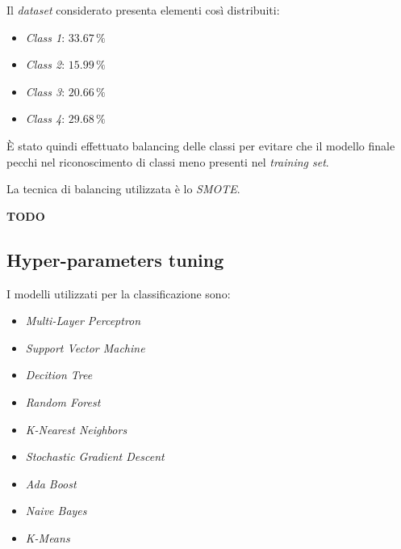                         Il \textit{dataset} considerato presenta elementi così distribuiti:
                        \begin{itemize}
                                \item \textit{Class 1}: $33.67 \, \%$
                                \item \textit{Class 2}: $15.99 \, \%$
                                \item \textit{Class 3}: $20.66 \, \%$
                                \item \textit{Class 4}: $29.68 \, \%$
                        \end{itemize}
                        
                        \`E stato quindi effettuato balancing delle classi per evitare che il modello finale pecchi nel riconoscimento di classi meno presenti nel \textit{training set}.
                        
                        La tecnica di balancing utilizzata è lo \textit{SMOTE}.
                        
                        \textbf{TODO}
                

        \subsection{Hyper-parameters tuning}
        
                I modelli utilizzati per la classificazione sono:
                \begin{itemize}
                        \item \textit{Multi-Layer Perceptron}
                        \item \textit{Support Vector Machine}
                        \item \textit{Decition Tree}
                        \item \textit{Random Forest}
                        \item \textit{K-Nearest Neighbors}
                        \item \textit{Stochastic Gradient Descent}
                        \item \textit{Ada Boost}
                        \item \textit{Naive Bayes}
                        \item \textit{K-Means}
                \end{itemize}
            
